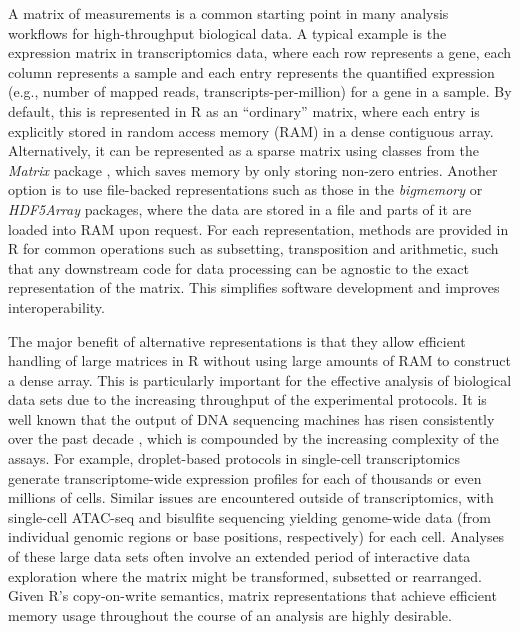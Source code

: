 \documentclass[10pt,letterpaper]{article}
\begin{document}
A matrix of measurements is a common starting point in many analysis workflows for high-throughput biological data.
A typical example is the expression matrix in transcriptomics data, where each row represents a gene, each column represents a sample and each entry represents the quantified expression (e.g., number of mapped reads, transcripts-per-million) for a gene in a sample.
By default, this is represented in R as an ``ordinary'' matrix, where each entry is explicitly stored in random access memory (RAM) in a dense contiguous array.
Alternatively, it can be represented as a sparse matrix using classes from the \textit{Matrix} package \cite{bates2017matrix}, which saves memory by only storing non-zero entries.
Another option is to use file-backed representations such as those in the \textit{bigmemory} \cite{kane2013scalable} or \textit{HDF5Array} packages, where the data are stored in a file and parts of it are loaded into RAM upon request.
For each representation, methods are provided in R for common operations such as subsetting, transposition and arithmetic, such that any downstream code for data processing can be agnostic to the exact representation of the matrix.
This simplifies software development and improves interoperability.

The major benefit of alternative representations is that they allow efficient handling of large matrices in R without using large amounts of RAM to construct a dense array.
This is particularly important for the effective analysis of biological data sets due to the increasing throughput of the experimental protocols.
It is well known that the output of DNA sequencing machines has risen consistently over the past decade \cite{reuter2015high}, which is compounded by the increasing complexity of the assays.
For example, droplet-based protocols in single-cell transcriptomics \cite{macosko2015highly,klein2015droplet,zheng2017massively} generate transcriptome-wide expression profiles for each of thousands or even millions of cells.
Similar issues are encountered outside of transcriptomics, with single-cell ATAC-seq \cite{buenrostro2015single} and bisulfite sequencing \cite{smallwood2014single} yielding genome-wide data (from individual genomic regions or base positions, respectively) for each cell.
Analyses of these large data sets often involve an extended period of interactive data exploration where the matrix might be transformed, subsetted or rearranged.
Given R's copy-on-write semantics, matrix representations that achieve efficient memory usage throughout the course of an analysis are highly desirable.
\end{document}
